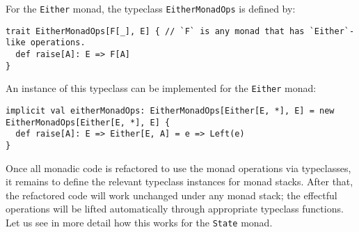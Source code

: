 For the \lstinline!Either! monad, the typeclass \lstinline!EitherMonadOps!
is defined by:
\begin{lstlisting}
trait EitherMonadOps[F[_], E] { // `F` is any monad that has `Either`-like operations.
  def raise[A]: E => F[A]
}
\end{lstlisting}
An instance of this typeclass can be implemented for the \lstinline!Either!
monad:
\begin{lstlisting}
implicit val eitherMonadOps: EitherMonadOps[Either[E, *], E] = new EitherMonadOps[Either[E, *], E] {
  def raise[A]: E => Either[E, A] = e => Left(e)
}
\end{lstlisting}

Once all monadic code is refactored to use the monad operations via
typeclasses, it remains to define the relevant typeclass instances
for monad stacks. After that, the refactored code will work unchanged
under any monad stack; the effectful operations will be lifted automatically
through appropriate typeclass functions. Let us see in more detail
how this works for the \lstinline!State! monad.

